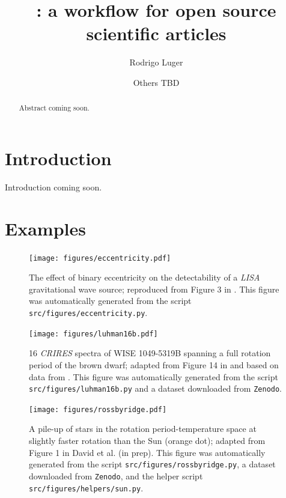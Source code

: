 \documentclass[twocolumn]{aastex631}
\begin{document}
\title{\showyourwork: a workflow for open source scientific articles}

\author[0000-0002-0296-3826]{Rodrigo Luger}
\author{Others TBD}

\begin{abstract}
    Abstract coming soon.
\end{abstract}

\section{Introduction}
\label{sec:intro}

Introduction coming soon.

\section{Examples}
\label{sec:examples}

\begin{figure}[ht!]
    \begin{centering}
        \texttt{[image: figures/eccentricity.pdf]}
        \caption{
            The effect of binary eccentricity on the detectability of a \emph{LISA} gravitational wave source; reproduced from Figure 3 in \citet{Wagg2021}. 
            This figure was automatically generated from the script \texttt{src/figures/eccentricity.py}.
        }
        \label{fig:eccentricity}
    \end{centering}
\end{figure}

\begin{figure}[ht!]
    \begin{centering}
        \texttt{[image: figures/luhman16b.pdf]}
        \caption{
            16 \emph{CRIRES} spectra of WISE 1049-5319B spanning a full rotation period of the brown dwarf; adapted from Figure 14 in \citet{Luger2021} and based on data from \citet{Crossfield2014}.
            This figure was automatically generated from the script \texttt{src/figures/luhman16b.py} and a dataset downloaded from \texttt{Zenodo}.
        }
        \label{fig:luhman16b}
    \end{centering}
\end{figure}

\begin{figure}[ht!]
    \begin{centering}
        \texttt{[image: figures/rossbyridge.pdf]}
        \caption{
            A pile-up of stars in the rotation period-temperature space at slightly faster rotation than the Sun (orange dot); adapted from Figure 1 in David et al. (in prep).
            This figure was automatically generated from the script \texttt{src/figures/rossbyridge.py}, a dataset downloaded from \texttt{Zenodo}, and the helper script \texttt{src/figures/helpers/sun.py}.
        }
        \label{fig:rossbyridge}
    \end{centering}
\end{figure}
\end{document}
